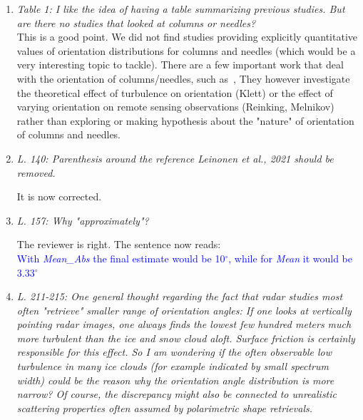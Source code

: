 \documentclass[12pt]{article}
\newcommand*{\blue}{\textcolor{blue}}
\begin{document}
\begin{enumerate}
    \item \textit{Table 1: I like the idea of having a table summarizing previous studies. But are there no studies that looked at columns or needles?}\\

    This is a good point. We did not find studies providing explicitly quantitative values of orientation distributions for columns and needles (which would be a very interesting topic to tackle). There are a few important work that deal with the orientation of columns/needles, such as~\cite{Klett_JAS_1995, Reinking_JAMC_1997, Melnikov_JAOT_2013}, They however investigate the theoretical effect of turbulence on orientation (Klett) or the effect of varying orientation on remote sensing observations (Reinking, Melnikov) rather than exploring or making hypothesis about the "nature" of orientation of columns and needles. 

    \item \textit{L. 140: Parenthesis around the reference Leinonen et al., 2021 should be removed.}
    
    \noindent
    It is now corrected.\\

    \item \textit{L. 157: Why "approximately"?}

    \noindent
    The reviewer is right. The sentence now reads:\\
    \blue{With \textit{Mean\_Abs} the final estimate would be 10$^\circ$, while for \textit{Mean} it would be 3.33$^\circ$}\\


    \item \textit{L. 211-215: One general thought regarding the fact that radar studies most often "retrieve" smaller range of orientation angles: If one looks at vertically pointing radar images, one always finds the lowest few hundred meters much more turbulent than the ice and snow cloud aloft. Surface friction is certainly responsible for this effect. So I am wondering if the often observable low turbulence in many ice clouds (for example indicated by small spectrum width) could be the reason why the orientation angle distribution is more narrow? Of course, the discrepancy might also be connected to unrealistic scattering properties often assumed by polarimetric shape retrievals.}


\end{enumerate}
\end{document}
